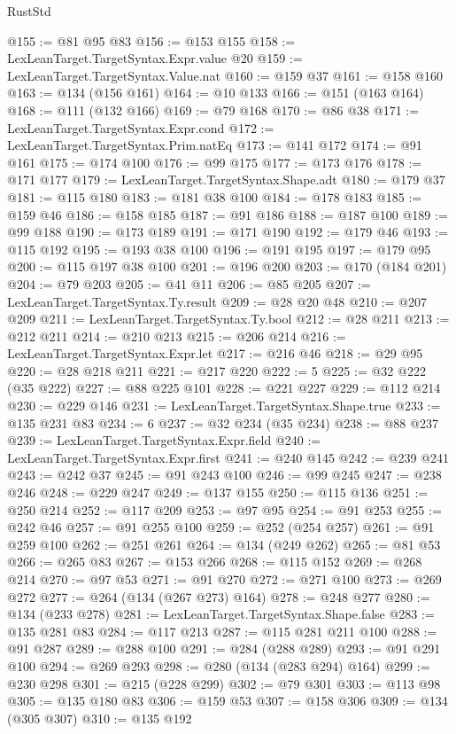\begin{lexlean}{RustStd}
\begin{coremodule}
{\begin{coremodule}
{{{{{{{{{{{{{{{{{{{{{{{{{{{{{{{{@155 := @81 @95 @83
@156 := @153 @155
@158 := LexLeanTarget.TargetSyntax.Expr.value @20
@159 := LexLeanTarget.TargetSyntax.Value.nat
@160 := @159 @37
@161 := @158 @160
@163 := @134 (@156 @161)
@164 := @10 @133
@166 := @151 (@163 @164)
@168 := @111 (@132 @166)
@169 := @79 @168
@170 := @86 @38
@171 := LexLeanTarget.TargetSyntax.Expr.cond
@172 := LexLeanTarget.TargetSyntax.Prim.natEq
@173 := @141 @172
@174 := @91 @161
@175 := @174 @100
@176 := @99 @175
@177 := @173 @176
@178 := @171 @177
@179 := LexLeanTarget.TargetSyntax.Shape.adt
@180 := @179 @37
@181 := @115 @180
@183 := @181 @38 @100
@184 := @178 @183
@185 := @159 @46
@186 := @158 @185
@187 := @91 @186
@188 := @187 @100
@189 := @99 @188
@190 := @173 @189
@191 := @171 @190
@192 := @179 @46
@193 := @115 @192
@195 := @193 @38 @100
@196 := @191 @195
@197 := @179 @95
@200 := @115 @197 @38 @100
@201 := @196 @200
@203 := @170 (@184 @201)
@204 := @79 @203
@205 := @41 @11
@206 := @85 @205
@207 := LexLeanTarget.TargetSyntax.Ty.result
@209 := @28 @20 @48
@210 := @207 @209
@211 := LexLeanTarget.TargetSyntax.Ty.bool
@212 := @28 @211
@213 := @212 @211
@214 := @210 @213
@215 := @206 @214
@216 := LexLeanTarget.TargetSyntax.Expr.let
@217 := @216 @46
@218 := @29 @95
@220 := @28 @218 @211
@221 := @217 @220
@222 := 5
@225 := @32 @222 (@35 @222)
@227 := @88 @225 @101
@228 := @221 @227
@229 := @112 @214
@230 := @229 @146
@231 := LexLeanTarget.TargetSyntax.Shape.true
@233 := @135 @231 @83
@234 := 6
@237 := @32 @234 (@35 @234)
@238 := @88 @237
@239 := LexLeanTarget.TargetSyntax.Expr.field
@240 := LexLeanTarget.TargetSyntax.Expr.first
@241 := @240 @145
@242 := @239 @241
@243 := @242 @37
@245 := @91 @243 @100
@246 := @99 @245
@247 := @238 @246
@248 := @229 @247
@249 := @137 @155
@250 := @115 @136
@251 := @250 @214
@252 := @117 @209
@253 := @97 @95
@254 := @91 @253
@255 := @242 @46
@257 := @91 @255 @100
@259 := @252 (@254 @257)
@261 := @91 @259 @100
@262 := @251 @261
@264 := @134 (@249 @262)
@265 := @81 @53
@266 := @265 @83
@267 := @153 @266
@268 := @115 @152
@269 := @268 @214
@270 := @97 @53
@271 := @91 @270
@272 := @271 @100
@273 := @269 @272
@277 := @264 (@134 (@267 @273) @164)
@278 := @248 @277
@280 := @134 (@233 @278)
@281 := LexLeanTarget.TargetSyntax.Shape.false
@283 := @135 @281 @83
@284 := @117 @213
@287 := @115 @281 @211 @100
@288 := @91 @287
@289 := @288 @100
@291 := @284 (@288 @289)
@293 := @91 @291 @100
@294 := @269 @293
@298 := @280 (@134 (@283 @294) @164)
@299 := @230 @298
@301 := @215 (@228 @299)
@302 := @79 @301
@303 := @113 @98
@305 := @135 @180 @83
@306 := @159 @53
@307 := @158 @306
@309 := @134 (@305 @307)
@310 := @135 @192
}}}}}}}}}}}}}}}}}}}}}}}}}}}}}}}}
\end{coremodule}}
\end{coremodule}
\end{lexlean}
